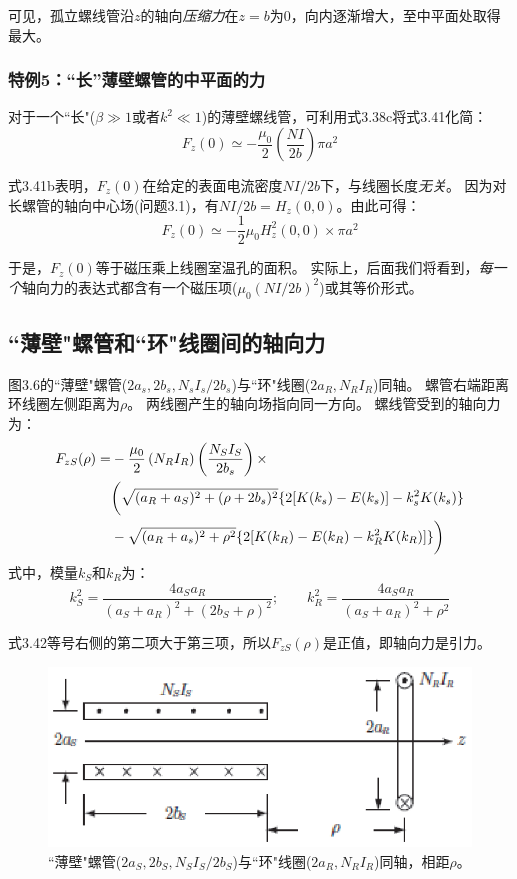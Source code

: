 可见，孤立螺线管沿$z$的轴向\textit{压缩力}在$z=b$为$0$，向内逐渐增大，至中平面处取得最大。

\subsubsection{特例5：``长''薄壁螺管的中平面的力}
对于一个``长"($\beta\gg 1$或者$k^2\ll 1$)的薄壁螺线管，可利用式3.38c将式3.41化简：
\begin{equation*}
F_z(0)\simeq-\frac{\mu_0}{2}\left(\frac{NI}{2b}\right)\pi a^2 \tag{3.41b}
\end{equation*}

式3.41b表明，$F_z(0)$在给定的表面电流密度$NI/2b$下，与线圈长度\textit{无关}。
因为对长螺管的轴向中心场(问题3.1)，有$NI/2b=H_z(0,0)$。由此可得：
\begin{equation*}
F_z(0)\simeq -\frac{1}{2}\mu_0 H_z^2(0,0)\times\pi a^2  \tag{3.41c}
\end{equation*}

于是，$F_z(0)$等于磁压乘上线圈室温孔的面积。
实际上，后面我们将看到，\textit{每一个}轴向力的表达式都含有一个磁压项($\mu_0(NI/2b)^2$)或其等价形式。

\subsection{``薄壁"螺管和``环"线圈间的轴向力}
图3.6的``薄壁"螺管($2a_s,2b_s,N_s I_s/2b_s$)与``环"线圈($2a_R,N_R I_R$)同轴。
螺管右端距离环线圈左侧距离为$\rho$。
两线圈产生的轴向场指向同一方向。
螺线管受到的轴向力为：
\begin{align}
F_{zS}(\rho)=&-\frac{\mu_0}{2}\left(N_R I_R\right)\left(\frac{N_S I_S}{2b_s}\right)\times\\\notag
&\bigg(\sqrt{(a_R+a_S)^2+(\rho+2b_s)^2}\{2[K(k_s)-E(k_s)]-k_s^2K(k_s)\}\\\notag
&-\sqrt{(a_R+a_s)^2+\rho^2}\{2[K(k_R)-E(k_R)-k_R^2K(k_R)]\}\bigg)
\end{align}
式中，模量$k_S$和$k_R$为：
$$k_{S}^2=\frac{4a_S a_R}{(a_S+a_R)^2+(2b_S+\rho)^2} ;\qquad k_{R}^2=\frac{4a_S a_R}{(a_S+a_R)^2+\rho^2} $$

式3.42等号右侧的第二项大于第三项，所以$F_{zS}(\rho)$是正值，即轴向力是引力。

\begin{figure}[htbp]
	\centering
	\includegraphics[scale=1]{chpt3/figs/fig3.6.eps}
	\caption{``薄壁"螺管($2a_S,2b_S,N_S I_S/2b_S$)与``环"线圈($2a_R,N_R I_R$)同轴，相距$\rho$。}
\end{figure}

